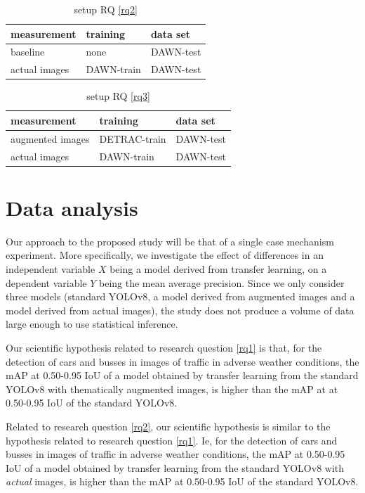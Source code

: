 \documentclass[]{article}
\begin{document}
	\begin{table}[H]
		\centering
		\begin{tabular}{lll}
			\toprule
			\textbf{measurement} & \textbf{training} & \textbf{data set} \\
			\midrule
			baseline & none & DAWN-test \\
			actual images & DAWN-train & DAWN-test \\
			\bottomrule
		\end{tabular}
		\caption{setup RQ \ref{rq2}}
		\label{table:setuprq2}
	\end{table}

	\begin{table}[H]
		\centering
		\begin{tabular}{lll}
			\toprule
			\textbf{measurement} & \textbf{training} & \textbf{data set} \\
			\midrule
			augmented images & DETRAC-train & DAWN-test \\
			actual images & DAWN-train & DAWN-test \\
			\bottomrule
		\end{tabular}
		\caption{setup RQ \ref{rq3}}
		\label{table:setuprq3}
	\end{table}

\section{Data analysis}

	Our approach to the proposed study will be that of a single case mechanism experiment. More specifically, we investigate the effect of differences in an independent variable $X$ being a model derived from transfer learning, on a dependent variable $Y$ being the mean average precision. Since we only consider three models (standard YOLO{\small v8}, a model derived from augmented images and a model derived from actual images), the study does not produce a volume of data large enough to use statistical inference.
	
	Our scientific hypothesis related to research question \ref{rq1} is that, for the detection of cars and busses in images of traffic in adverse weather conditions, the mAP at 0.50-0.95 IoU of a model obtained by transfer learning from the standard YOLO{\small v8} with thematically augmented images, is higher than the mAP at at 0.50-0.95 IoU of the standard YOLO{\small v8}. 	
	
	Related to research question \ref{rq2}, our scientific hypothesis is similar to the hypothesis related to research question \ref{rq1}. Ie, for the detection of cars and busses in images of traffic in adverse weather conditions, the mAP at 0.50-0.95 IoU of a model obtained by transfer learning from the standard YOLO{\small v8} with  \textit{actual} images, is higher than the mAP at 0.50-0.95 IoU of the standard YOLO{\small v8}.  
	
\end{document}
